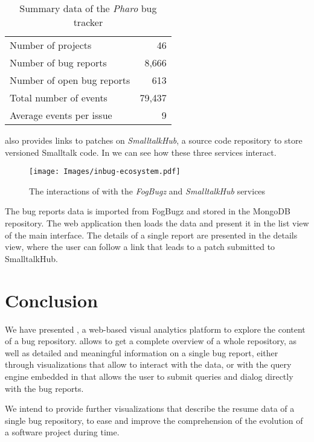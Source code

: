 \begin{table}[ht]
\center
\caption{Summary data of the \textit{Pharo} bug tracker}
\label{tab-tracker-summary}
\begin{tabular}{p{7cm} r} \hline
Number of projects & 46 \\
Number of bug reports & 8,666 \\
Number of open bug reports & 613 \\
Total number of events & 79,437 \\
Average events per issue & 9 \\ \hline
\end{tabular}
\end{table}

\ib also provides links to patches on \emph{SmalltalkHub}, a source code repository to store versioned Smalltalk code. In  we can see how these three services interact.

\begin{figure}[ht]
\texttt{[image: Images/inbug-ecosystem.pdf]}
\caption{The interactions of \ib with the \emph{FogBugz} and \emph{SmalltalkHub} services}
\label{fig-inbug-ecosystem}
\end{figure}


The bug reports data is imported from FogBugz and stored in the MongoDB repository. The web application then loads the data and present it in the list view of the main interface. The details of a single report are presented in the details view, where the user can follow a link that leads to a patch submitted to SmalltalkHub.
%
\section{Conclusion}

We have presented \ib, a web-based visual analytics platform to explore the content of a bug repository. \ib allows to get a complete overview of a whole repository, as well as detailed and meaningful information on a single bug report, either through visualizations that allow to interact with the data, or with the query engine embedded in \ib that allows the user to submit queries and dialog directly with the bug reports.

We intend to provide further visualizations that describe the resume data of a single bug repository, to ease and improve the comprehension of the evolution of a software project during time.

